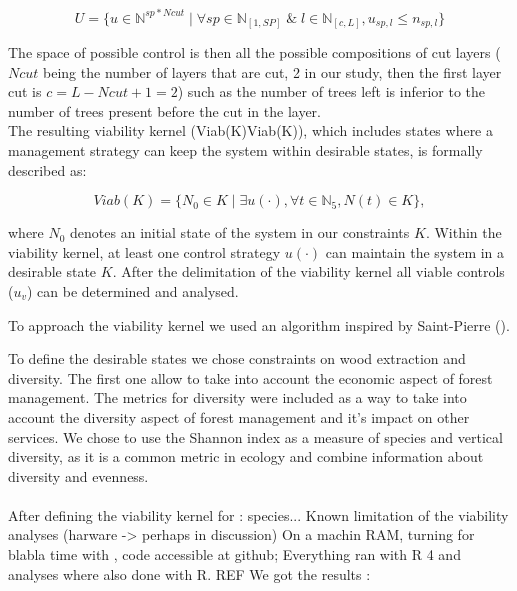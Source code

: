 \documentclass{article}
\begin{document}
\[
     U = \{u \in \mathbb{N}^{sp*Ncut} \mid \forall sp \in \mathbb{N}_{[1,SP]} \; \& \; l \in \mathbb{N}_{[c,L]}, u_{sp,l} \leq n_{sp,l}\}
\]

The space of possible control is then all the possible compositions of cut layers ($Ncut$ being the number of layers that are cut, 2 in our study, then the first layer cut is $c = L-Ncut+1 = 2$) such as the number of trees left is inferior to the number of trees present before the cut in the layer.\\

The resulting viability kernel (Viab(K)Viab(K)), which includes states where a management strategy can keep the system within desirable states, is formally described as:

\[
Viab(K) = \{N_0 \in K \mid\exists u(\cdot), \forall t \in \mathbb{N}_5, N(t) \in K\},
\]

where \(N_0\) denotes an initial state of the system in our constraints $K$. Within the viability kernel, at least one control strategy $u(\cdot)$ can maintain the system in a desirable state $K$. After the delimitation of the viability kernel all viable controls (\(u_v\)) can be determined and analysed.

To approach the viability kernel we used an algorithm inspired by Saint-Pierre (\autocite{saint-pierreApproximationViabilityKernel1994}).

To define the desirable states we chose constraints on wood extraction and diversity. The first one allow to take into account the economic aspect of forest management. The metrics for diversity were included as a way to take into account the diversity aspect of forest management and it's impact on other services. We chose to use the Shannon index as a measure of species and vertical diversity, as it is a common metric in ecology and combine information about diversity and evenness. \\
\\

After defining the viability kernel for : species...
Known limitation of the viability analyses (harware -> perhaps in discussion)
On a machin RAM, turning for blabla time with , code accessible at github; 
Everything ran with R 4 and analyses where also done with R. REF
We got the results :
\end{document}
